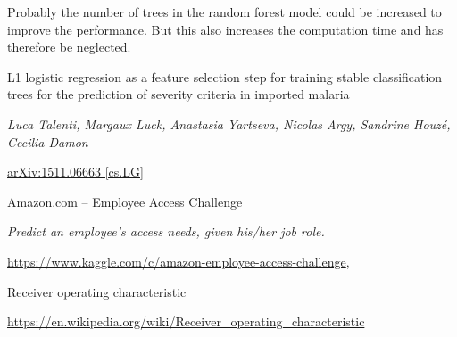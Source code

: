 \documentclass[11pt]{article}
\begin{document}
Probably the number of trees in the random forest model could be increased to 
improve the performance. But this also increases the computation time and has therefore be neglected.

\begin{thebibliography}{9}

    L1 logistic regression as a feature selection step for training stable 
    classification trees for the prediction of severity criteria in imported malaria

    \textit{Luca Talenti, Margaux Luck, Anastasia Yartseva, Nicolas Argy, Sandrine Houzé, Cecilia Damon}

    \href{https://arxiv.org/abs/1511.06663}{arXiv:1511.06663 [cs.LG]}

    Amazon.com -- Employee Access Challenge 

    \textit{Predict an employee's access needs, given his/her job role.}

    \href{https://www.kaggle.com/c/amazon-employee-access-challenge}
    {https://www.kaggle.com/c/amazon-employee-access-challenge},


    Receiver operating characteristic 

    \href{https://en.wikipedia.org/wiki/Receiver_operating_characteristic}
    {https://en.wikipedia.org/wiki/Receiver\_operating\_characteristic}

\end{thebibliography}
\end{document}
